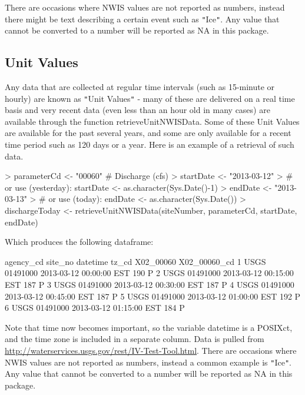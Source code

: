 \documentclass[a4paper,11pt]{article}
\begin{document}
There are occasions where NWIS values are not reported as numbers, instead there might be text describing a certain event such as \texttt{"}Ice\texttt{"}.  Any value that cannot be converted to a number will be reported as NA in this package.

\FloatBarrier
\subsection{Unit Values}
\label{sec:usgsRT}
Any data that are collected at regular time intervals (such as 15-minute or hourly) are known as \texttt{"}Unit Values\texttt{"} - many of these are delivered on a real time basis and very recent data (even less than an hour old in many cases) are available through the function retrieveUnitNWISData.  Some of these Unit Values are available for the past several years, and some are only available for a recent time period such as 120 days or a year.  Here is an example of a retrieval of such data.  

\begin{Schunk}
\begin{Sinput}
> parameterCd <- "00060"  # Discharge (cfs)
> startDate <- "2013-03-12" 
> # or use (yesterday): startDate <- as.character(Sys.Date()-1)
> endDate <- "2013-03-13" 
> # or use (today):  endDate <- as.character(Sys.Date())
> dischargeToday <- retrieveUnitNWISData(siteNumber, parameterCd, 
         startDate, endDate)
\end{Sinput}
\end{Schunk}
Which produces the following dataframe:
\begin{Schunk}
\begin{Soutput}
  agency_cd  site_no            datetime tz_cd X02_00060 X02_00060_cd
1      USGS 01491000 2013-03-12 00:00:00   EST       190            P
2      USGS 01491000 2013-03-12 00:15:00   EST       187            P
3      USGS 01491000 2013-03-12 00:30:00   EST       187            P
4      USGS 01491000 2013-03-12 00:45:00   EST       187            P
5      USGS 01491000 2013-03-12 01:00:00   EST       192            P
6      USGS 01491000 2013-03-12 01:15:00   EST       184            P
\end{Soutput}
\end{Schunk}

Note that time now becomes important, so the variable datetime is a POSIXct, and the time zone is included in a separate column. Data is pulled from \url{http://waterservices.usgs.gov/rest/IV-Test-Tool.html}. There are occasions where NWIS values are not reported as numbers, instead a common example is \texttt{"}Ice\texttt{"}.  Any value that cannot be converted to a number will be reported as NA in this package.
\end{document}
